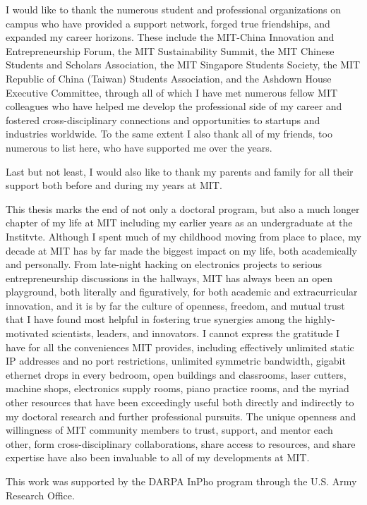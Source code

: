 I would like to thank the numerous student and professional organizations on campus who have provided a support network, forged true friendships, and expanded my career horizons. These include the MIT-China Innovation and Entrepreneurship Forum, the MIT Sustainability Summit, the MIT Chinese Students and Scholars Association, the MIT Singapore Students Society, the MIT Republic of China (Taiwan) Students Association, and the Ashdown House Executive Committee, through all of which I have met numerous fellow MIT colleagues who have helped me develop the professional side of my career and fostered cross-disciplinary connections and opportunities to startups and industries worldwide. To the same extent I also thank all of my friends, too numerous to list here, who have supported me over the years.

Last but not least, I would also like to thank my parents and family for all their support both before and during my years at MIT.

This thesis marks the end of not only a doctoral program, but also a much longer chapter of my life at MIT including my earlier years as an undergraduate at the Institvte. Although I spent much of my childhood moving from place to place, my decade at MIT has by far made the biggest impact on my life, both academically and personally. From late-night hacking on electronics projects to serious entrepreneurship discussions in the hallways, MIT has always been an open playground, both literally and figuratively, for both academic and extracurricular innovation, and it is by far the culture of openness, freedom, and mutual trust that I have found most helpful in fostering true synergies among the highly-motivated scientists, leaders, and innovators. I cannot express the gratitude I have for all the conveniences MIT provides, including effectively unlimited static IP addresses and no port restrictions, unlimited symmetric bandwidth, gigabit ethernet drops in every bedroom, open buildings and classrooms, laser cutters, machine shops, electronics supply rooms, piano practice rooms, and the myriad other resources that have been exceedingly useful both directly and indirectly to my doctoral research and further professional pursuits. The unique openness and willingness of MIT community members to trust, support, and mentor each other, form cross-disciplinary collaborations, share access to resources, and share expertise have also been invaluable to all of my developments at MIT.

This work was supported by the DARPA InPho program through the U.S. Army Research Office.

